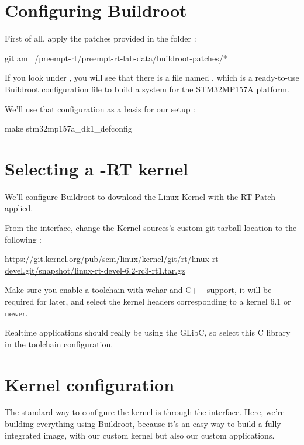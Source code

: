 \section{Configuring Buildroot}

First of all, apply the patches provided in the  folder :

\begin{bashinput}
	git am ~/preempt-rt/preempt-rt-lab-data/buildroot-patches/*
\end{bashinput}

If you look under , you will see that there is a file
named , which is a ready-to-use Buildroot
configuration file to build a system for the STM32MP157A platform.

We'll use that configuration as a basis for our setup :

\begin{bashinput}
make stm32mp157a_dk1_defconfig
\end{bashinput}

\section{Selecting a -RT kernel}

We'll configure Buildroot to download the Linux Kernel with the RT Patch applied.

From the  interface, change the Kernel sources's custom
git tarball location to the following :

\url{https://git.kernel.org/pub/scm/linux/kernel/git/rt/linux-rt-devel.git/snapshot/linux-rt-devel-6.2-rc3-rt1.tar.gz}

Make sure you enable a toolchain with wchar and C++ support, it will be required
for later, and select the kernel headers corresponding to a kernel 6.1 or newer.

Realtime applications should really be using the GLibC, so select this C library in the
toolchain configuration.

\section{Kernel configuration}
The standard way to configure the kernel is through the  interface. Here, we're building everything using
Buildroot, because it's an easy way to build a fully integrated image, with our custom kernel but also our custom applications.

